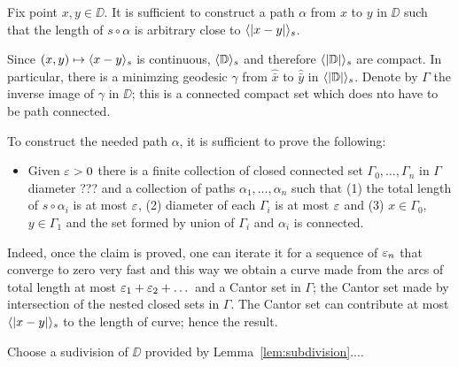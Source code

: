 Fix point $x,y\in \DD$.
It is sufficient to construct a path $\alpha$ from $x$ to $y$ in $\DD$ such that the length of $s\circ\alpha$ is arbitrary close to $\langle|x-y|\rangle_s$.

Since $(x,y)\mapsto \langle x-y\rangle_s$ is continuous, $\langle\mathbb{D}\rangle_s$ and therefore $\langle|\mathbb{D}|\rangle_s$ are compact.
In particular, there is a minimzing geodesic $\gamma$ from $\hat{\bar x}$ to $\hat{\bar y}$ in $\langle|\mathbb{D}|\rangle_s$.
Denote by $\Gamma$ the inverse image of $\gamma$ in $\DD$;
this is a connected compact set which does nto have to be path connected.

To construct the needed path $\alpha$, it is sufficient to prove the following:

\begin{itemize}
 \item Given $\varepsilon>0$ there is a finite collection of closed connected set $\Gamma_0,\dots,\Gamma_n$ in $\Gamma$ diameter ???
 and a collection of paths $\alpha_1,\dots,\alpha_n$ such that (1) the total length of $s\circ\alpha_i$ is at most $\varepsilon$, (2) diameter of each $\Gamma_i$ is at most $\varepsilon$ and (3) $x\in\Gamma_0$, $y\in\Gamma_1$ and the set formed by union of $\Gamma_i$ and $\alpha_i$ is connected.
\end{itemize}

Indeed, once the claim is proved, one can iterate it for a sequence of $\varepsilon_n$ that converge to zero very fast and this way we obtain a curve made from the arcs of total length at most $\varepsilon_1+\varepsilon_2+\dots$ and a Cantor set in $\Gamma$; the Cantor set made by intersection of the nested closed sets in $\Gamma$.
The Cantor set can contribute at most $\langle|x-y|\rangle_s$ to the length of curve; hence the result.

Choose a sudivision of $\DD$ provided by Lemma~\ref{lem:subdivision}....
\qeds



